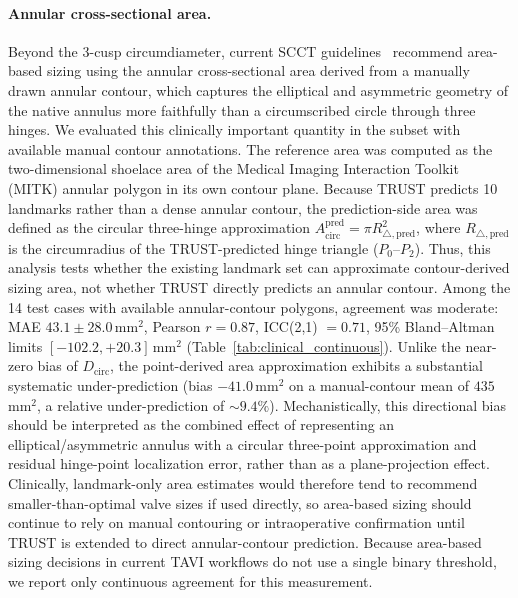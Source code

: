 \documentclass[conference]{IEEEtran}
\begin{document}
\paragraph{Annular cross-sectional area.}
Beyond the 3-cusp circumdiameter, current SCCT guidelines~\cite{Blanke2019_scct_tavi_ct} recommend area-based sizing using the annular cross-sectional area derived from a manually drawn annular contour, which captures the elliptical and asymmetric geometry of the native annulus more faithfully than a circumscribed circle through three hinges. We evaluated this clinically important quantity in the subset with available manual contour annotations. The reference area was computed as the two-dimensional shoelace area of the Medical Imaging Interaction Toolkit (MITK) annular polygon in its own contour plane. Because TRUST predicts 10 landmarks rather than a dense annular contour, the prediction-side area was defined as the circular three-hinge approximation $A_{\text{circ}}^{\text{pred}} = \pi R_{\triangle,\text{pred}}^2$, where $R_{\triangle,\text{pred}}$ is the circumradius of the TRUST-predicted hinge triangle ($P_0$--$P_2$). Thus, this analysis tests whether the existing landmark set can approximate contour-derived sizing area, not whether TRUST directly predicts an annular contour. Among the 14 test cases with available annular-contour polygons, agreement was moderate: MAE $43.1 \pm 28.0$\,mm$^2$, Pearson $r = 0.87$, ICC(2,1) $= 0.71$, 95\% Bland--Altman limits $[-102.2, +20.3]$\,mm$^2$ (Table~\ref{tab:clinical_continuous}). Unlike the near-zero bias of $D_{\text{circ}}$, the point-derived area approximation exhibits a substantial systematic under-prediction (bias $-41.0$\,mm$^2$ on a manual-contour mean of $435$\,mm$^2$, a relative under-prediction of $\sim 9.4\%$). Mechanistically, this directional bias should be interpreted as the combined effect of representing an elliptical/asymmetric annulus with a circular three-point approximation and residual hinge-point localization error, rather than as a plane-projection effect. Clinically, landmark-only area estimates would therefore tend to recommend smaller-than-optimal valve sizes if used directly, so area-based sizing should continue to rely on manual contouring or intraoperative confirmation until TRUST is extended to direct annular-contour prediction. Because area-based sizing decisions in current TAVI workflows do not use a single binary threshold, we report only continuous agreement for this measurement.
\end{document}
